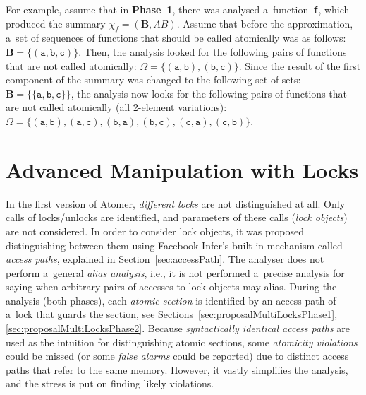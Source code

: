 \begin{example}
    For example, assume that in \textbf{Phase~1}, there was analysed
    a~function~\texttt{f}, which produced the summary $ \chi_f =
    {(\boldsymbol{B}, AB)} $. Assume that before the approximation,
    a~set of sequences of functions that should be called atomically was
    as follows: $ \boldsymbol{B} = \{{(\mathtt{a}, \mathtt{b},
    \mathtt{c})}\} $. Then, the analysis looked for the following
    pairs of functions that are not called atomically: $ \Omega =
    \{{(\mathtt{a, b})}, {(\mathtt{b, c})}\} $. Since the result of the
    first component of the summary was changed to the following set of
    sets: $ \boldsymbol{B} = \{{\{\mathtt{a}, \mathtt{b}, \mathtt{c}\}}\} $,
    the analysis now looks for the following pairs  of functions that are not
    called atomically (all 2-element variations): $ \Omega = \{{(\mathtt{a},
    \mathtt{b})}, {(\mathtt{a}, \mathtt{c})}, {(\mathtt{b}, \mathtt{a})},
    {(\mathtt{b}, \mathtt{c})}, {(\mathtt{c}, \mathtt{a})}, {(\mathtt{c},
    \mathtt{b})}\} $.
\end{example}


\section{Advanced Manipulation with Locks}
\label{sec:proposalAdvancedLocks}

In the first version of Atomer, \emph{different locks} are not distinguished
at all. Only calls of locks/unlocks are identified, and parameters of these
calls (\emph{lock objects}) are not considered. In order to consider lock
objects, it was proposed distinguishing between them using Facebook Infer's
built-in mechanism called \emph{access paths}, explained in
Section~\ref{sec:accessPath}. The analyser does not perform a~general
\emph{alias analysis}, i.e., it is not performed a~precise analysis for
saying when arbitrary pairs of accesses to lock objects may alias. During
the analysis (both phases), each \emph{atomic section} is identified by an
access path of a~lock that guards the section, see
Sections~\ref{sec:proposalMultiLocksPhase1}, \ref{sec:proposalMultiLocksPhase2}.
Because \emph{syntactically identical access paths} are used as the intuition
for distinguishing atomic sections, some \emph{atomicity violations} could be
missed (or some \emph{false alarms} could be reported) due to distinct access
paths that refer to the same memory. However, it vastly simplifies the
analysis, and the stress is put on finding likely violations.

